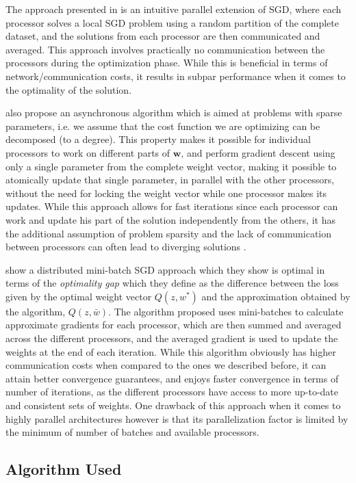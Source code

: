 \documentclass[11pt,a4paper]{article}
\newcommand{\Wb}{\mathbf{w}}
\begin{document}
The approach presented in \citep{zinkevich2010parallelized} is an intuitive parallel extension of
SGD, where each processor solves a local SGD problem using a random partition of the
complete dataset, and the solutions from each processor are then communicated and averaged. This
approach involves practically no communication between the processors during the optimization
phase. While this is beneficial in terms of network/communication costs, it results in subpar
performance when it comes to the optimality of the solution.

\cite{recht2011hogwild} also propose an asynchronous algorithm which is aimed at problems with
sparse parameters, i.e. we assume that the cost function we are optimizing can be decomposed (to a
degree). This property makes it possible for individual processors to work on different parts of
$\Wb$, and perform gradient descent using only a single parameter from the complete weight vector,
making it possible to atomically update that single parameter, in parallel with the other
processors, without the need for locking the weight vector while one processor makes its updates.
While this approach allows for fast iterations since each processor can work and update his part of
the solution independently from the others, it has the additional assumption of problem sparsity
and the lack of communication between processors can often lead to diverging solutions
\citep{dai2015analysis}.

\cite{dekel2012optimal} show a distributed mini-batch SGD approach which they show is optimal in
terms of the \textit{optimality gap} which they define as the difference between the loss given by
the optimal weight vector $Q(z, w^*)$ and the approximation obtained by the algorithm, $Q(z,
\bar{w})$. The algorithm proposed uses mini-batches to calculate approximate gradients for each
processor, which are then summed and averaged across the different processors, and the averaged
gradient is used to update the weights at the end of each iteration. While this algorithm obviously
has higher communication costs when compared to the ones we described before, it can attain better
convergence guarantees, and enjoys faster convergence in terms of number of iterations, as the
different processors have access to more up-to-date and consistent sets of weights. One drawback of
this approach when it comes to highly parallel architectures however is that its parallelization
factor is limited by the minimum of number of batches and available processors.

\subsection{Algorithm Used}
\end{document}
